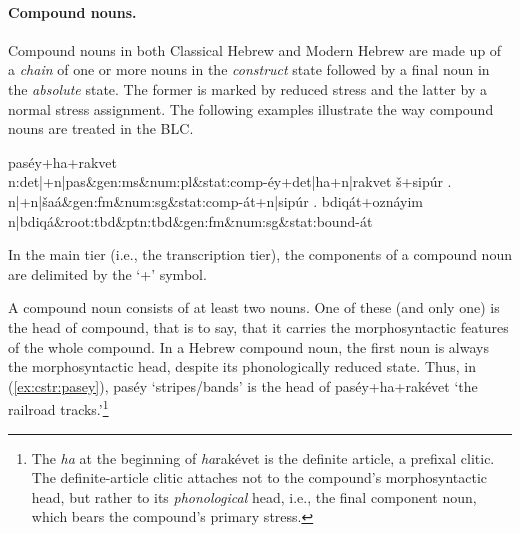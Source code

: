 \paragraph{Compound nouns.}
Compound nouns in both Classical Hebrew and Modern Hebrew are made up of a \emph{chain} of 
one or more nouns in the \emph{construct} state followed by a final noun
in the \emph{absolute} state. The former is marked by reduced stress 
and the latter by a normal stress assignment. The following examples 
illustrate the way compound nouns are treated in the \ac{BLC}.
\begin{exe}
\ex \label{ex:cstr:pasey}
	\textsf{pas\'{e}y+ha+rakvet} \\
	\textsf{n:det|+n|pas\&gen:ms\&num:pl\&stat:comp-\'{e}y+det|ha+n|rakvet}
\ex \label{ex:cstr:shaat} 
	\textsf{\v{s}+sip\'{u}r .} \\
	\textsf{n|+n|\v{s}a\'a\&gen:fm\&num:sg\&stat:comp-\'at+n|sip\'ur .}
\ex \label{ex:cstr:bdiqat} 
	\textsf{bdiq\'{a}t+ozn\'{a}yim} \\ 
	\textsf{n|bdiq\'{a}\&root:tbd\&ptn:tbd\&gen:fm\&num:sg\&stat:bound-\'{a}t}
\end{exe}
In the main tier (i.e., the transcription tier), the components of a compound noun are
delimited by the `+' symbol. 

A compound noun consists of at least two nouns. One of these 
(and only one) is the head of compound, that is to say, that it carries 
the morphosyntactic features of the whole compound. In a Hebrew compound 
noun, the first noun
is always the morphosyntactic head, despite its phonologically 
reduced state.
Thus, in (\ref{ex:cstr:pasey}), \textsf{pas\'{e}y} `stripes/bands' 
is the head of \textsf{pas\'{e}y+ha+rak\'{e}vet} `the railroad 
tracks.'\footnote{The \textit{ha} at the beginning of  
\textsf{\textit{ha}rak\'{e}vet} is the definite article, a prefixal 
clitic. The definite-article clitic attaches not to the compound's 
morphosyntactic head, but rather to its \emph{phonological} head, 
i.e., the final component noun, which bears the compound's primary stress.}

